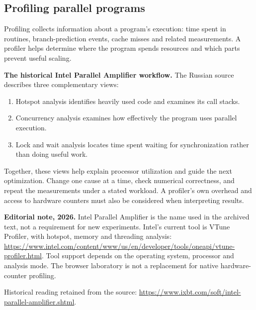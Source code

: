 { %
\subsection{Profiling parallel programs}
\label{profiling:section}
\par Profiling collects information about a program's execution: time spent in routines, branch-prediction events, cache misses and related measurements. A profiler helps determine where the program spends resources and which parts prevent useful scaling.
\par\textbf{The historical Intel Parallel Amplifier workflow.} The Russian source describes three complementary views:
\begin{enumerate}
\item Hotspot analysis identifies heavily used code and examines its call stacks.
\item Concurrency analysis examines how effectively the program uses parallel execution.
\item Lock and wait analysis locates time spent waiting for synchronization rather than doing useful work.
\end{enumerate}
\par Together, these views help explain processor utilization and guide the next optimization. Change one cause at a time, check numerical correctness, and repeat the measurements under a stated workload. A profiler's own overhead and access to hardware counters must also be considered when interpreting results.
\par\textbf{Editorial note, 2026.} Intel Parallel Amplifier is the name used in the archived text, not a requirement for new experiments. Intel's current tool is VTune Profiler, with hotspot, memory and threading analysis: \url{https://www.intel.com/content/www/us/en/developer/tools/oneapi/vtune-profiler.html}. Tool support depends on the operating system, processor and analysis mode. The browser laboratory is not a replacement for native hardware-counter profiling.
\par Historical reading retained from the source: \url{https://www.ixbt.com/soft/intel-parallel-amplifier.shtml}.
}
